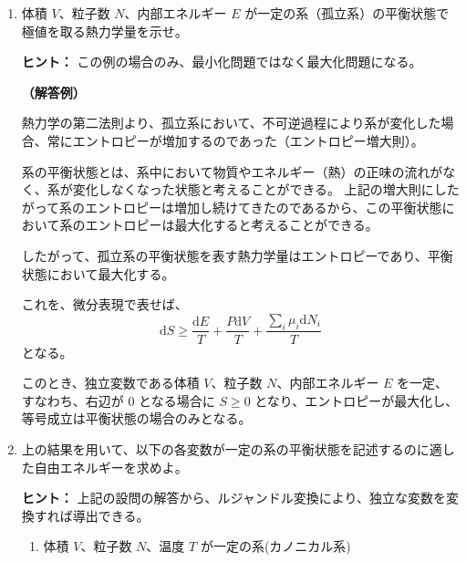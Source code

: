 \documentclass[uplatex,dvipdfmx,a4paper,11pt]{jsarticle}
\newcommand{\diff}{\mathrm d}
\begin{document}
\begin{enumerate}
\setlength{\parskip}{0cm} %
\setlength{\itemsep}{0.5cm} %
\item
体積 $V$、粒子数 $N$、内部エネルギー $E$ が一定の系（孤立系）の平衡状態で極値を取る熱力学量を示せ。

\begin{itembox}[l]{{\bf ヒント：}}
この例の場合のみ、最小化問題ではなく最大化問題になる。
\end{itembox}

\vspace{10pt}

{\bf （解答例）}

熱力学の第二法則より、孤立系において、不可逆過程により系が変化した場合、常にエントロピーが増加するのであった（エントロピー増大則）。

系の平衡状態とは、系中において物質やエネルギー（熱）の正味の流れがなく、系が変化しなくなった状態と考えることができる。
上記の増大則にしたがって系のエントロピーは増加し続けてきたのであるから、この平衡状態において系のエントロピーは最大化すると考えることができる。

したがって、孤立系の平衡状態を表す熱力学量はエントロピーであり、平衡状態において最大化する。

これを、微分表現で表せば、
\begin{equation*}
\diff S \geq \dfrac{\diff E}{T} + \dfrac{P \diff V}{T} + \dfrac{\sum_i \mu_i \diff N_i}{T}
\end{equation*}
となる。

このとき、独立変数である体積 $V$、粒子数 $N$、内部エネルギー $E$ を一定、すなわち、右辺が 0 となる場合に $S \geq 0$ となり、エントロピーが最大化し、等号成立は平衡状態の場合のみとなる。



\newpage

\item
上の結果を用いて、以下の各変数が一定の系の平衡状態を記述するのに適した自由エネルギーを求めよ。

\begin{itembox}[l]{{\bf ヒント：}}
上記の設問の解答から、ルジャンドル変換により、独立な変数を変換すれば導出できる。
\end{itembox}

\vspace{10pt}

\begin{enumerate}
\item
体積 $V$、粒子数 $N$、温度 $T$ が一定の系(カノニカル系)



\end{enumerate}
\end{enumerate}
\end{document}
